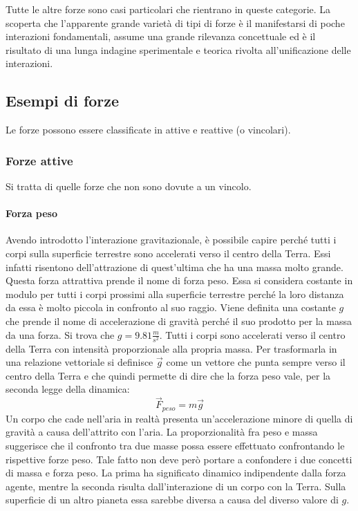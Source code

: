 \documentclass[10pt,a4paper]{book}
\begin{document}
Tutte le altre forze sono casi particolari che rientrano in queste categorie. La scoperta che l'apparente grande varietà di tipi di forze è il manifestarsi di poche interazioni fondamentali, assume una grande rilevanza concettuale ed è il risultato di una lunga indagine sperimentale e teorica rivolta all'unificazione delle interazioni.

\subsection{Esempi di forze}

Le forze possono essere classificate in attive e reattive (o vincolari).

\subsubsection{Forze attive}

Si tratta di quelle forze che non sono dovute a un vincolo.

\paragraph{Forza peso} Avendo introdotto l'interazione gravitazionale, è possibile capire perché tutti i corpi sulla superficie terrestre sono accelerati verso il centro della Terra. Essi infatti risentono dell'attrazione di quest'ultima che ha una massa molto grande. Questa forza attrattiva prende il nome di forza peso. Essa si considera costante in modulo per tutti i corpi prossimi alla superficie terrestre perché la loro distanza da essa è molto piccola in confronto al suo raggio. Viene definita una costante $g$ che prende il nome di accelerazione di gravità perché il suo prodotto per la massa da una forza. Si trova che $g=9.81 \frac{m}{s^2}$. Tutti i corpi sono accelerati verso il centro della Terra con intensità proporzionale alla propria massa. Per trasformarla in una relazione vettoriale si definisce $\vec{g}$ come un vettore che punta sempre verso il centro della Terra e che quindi permette di dire che la forza peso vale, per la seconda legge della dinamica:
\[
	\vec{F}_{peso}=m\vec{g}
\]
Un corpo che cade nell'aria in realtà presenta un'accelerazione minore di quella di gravità a causa dell'attrito con l'aria. La proporzionalità fra peso e massa suggerisce che il confronto tra due masse possa essere effettuato confrontando le rispettive forze peso. Tale fatto non deve però portare a confondere i due concetti di massa e forza peso. La prima ha significato dinamico indipendente dalla forza agente, mentre la seconda risulta dall'interazione di un corpo con la Terra. Sulla superficie di un altro pianeta essa sarebbe diversa a causa del diverso valore di $g$.
\end{document}
